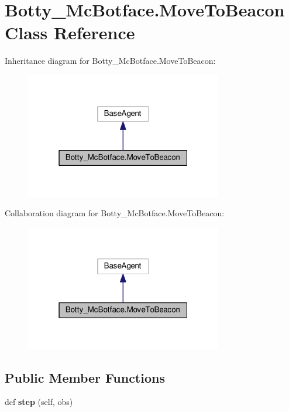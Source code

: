 \hypertarget{classBotty__McBotface_1_1MoveToBeacon}{}\section{Botty\+\_\+\+Mc\+Botface.\+Move\+To\+Beacon Class Reference}
\label{classBotty__McBotface_1_1MoveToBeacon}


Inheritance diagram for Botty\+\_\+\+Mc\+Botface.\+Move\+To\+Beacon\+:
\nopagebreak
\begin{figure}[H]
\begin{center}
\leavevmode
\includegraphics[width=244pt]{classBotty__McBotface_1_1MoveToBeacon__inherit__graph}
\end{center}
\end{figure}


Collaboration diagram for Botty\+\_\+\+Mc\+Botface.\+Move\+To\+Beacon\+:
\nopagebreak
\begin{figure}[H]
\begin{center}
\leavevmode
\includegraphics[width=244pt]{classBotty__McBotface_1_1MoveToBeacon__coll__graph}
\end{center}
\end{figure}
\subsection*{Public Member Functions}
\begin{DoxyCompactItemize}
\item 
def {\bfseries step} (self, obs)\hypertarget{classBotty__McBotface_1_1MoveToBeacon_a4a6512d538e2f3db2cd2b0a2e9478258}{}\label{classBotty__McBotface_1_1MoveToBeacon_a4a6512d538e2f3db2cd2b0a2e9478258}

\end{DoxyCompactItemize}


